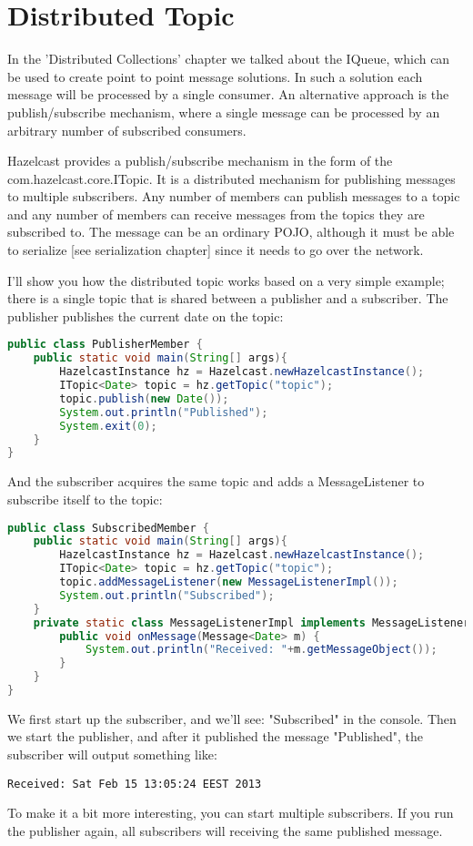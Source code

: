 \chapter{Distributed Topic}
In the 'Distributed Collections' chapter we talked about the IQueue, which can be used to create point to point message solutions. In such a solution each message will be processed by a single consumer. An alternative approach is the publish/subscribe mechanism, where a single message can be processed by an arbitrary number of subscribed consumers.

Hazelcast provides a publish/subscribe mechanism in the form of the com.hazelcast.core.ITopic. It is a distributed mechanism for publishing messages to multiple subscribers. Any number of members can publish messages to a topic and any number of members can receive messages from the topics they are subscribed to. The message can be an ordinary POJO, although it must be able to serialize [see serialization chapter] since it needs to go over the network.

I'll show you how the distributed topic works based on a very simple example; there is a single topic that is shared between a publisher and a subscriber. The publisher publishes the current date on the topic:
\begin{lstlisting}[language=java]
public class PublisherMember {
    public static void main(String[] args){
        HazelcastInstance hz = Hazelcast.newHazelcastInstance();
        ITopic<Date> topic = hz.getTopic("topic");
        topic.publish(new Date());
        System.out.println("Published");
        System.exit(0);
    }
}
\end{lstlisting}
And the subscriber acquires the same topic and adds a MessageListener to subscribe itself to the topic:
\begin{lstlisting}[language=java]
public class SubscribedMember {
    public static void main(String[] args){
        HazelcastInstance hz = Hazelcast.newHazelcastInstance();
        ITopic<Date> topic = hz.getTopic("topic");
        topic.addMessageListener(new MessageListenerImpl());
        System.out.println("Subscribed");
    }
    private static class MessageListenerImpl implements MessageListener<Date> {
        public void onMessage(Message<Date> m) {
            System.out.println("Received: "+m.getMessageObject());
        }
    }
}
\end{lstlisting}
We first start up the subscriber, and we'll see: "Subscribed" in the console. Then we start the publisher, and after it published the message "Published", the subscriber will output something like:
\begin{lstlisting}
Received: Sat Feb 15 13:05:24 EEST 2013
\end{lstlisting}
To make it a bit more interesting, you can start multiple subscribers. If you run the publisher again, all subscribers will receiving the same published message.

